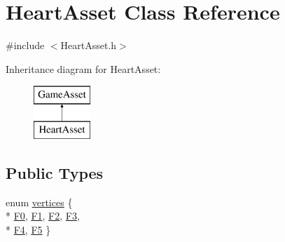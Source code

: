 \hypertarget{classHeartAsset}{\section{Heart\-Asset Class Reference}
\label{classHeartAsset}
}


{\ttfamily \#include $<$Heart\-Asset.\-h$>$}

Inheritance diagram for Heart\-Asset\-:\begin{figure}[H]
\begin{center}
\leavevmode
\includegraphics[height=2.000000cm]{classHeartAsset}
\end{center}
\end{figure}
\subsection*{Public Types}
\begin{DoxyCompactItemize}
\item 
enum \hyperlink{classHeartAsset_ab2382a6a68d870ea588f3e993a1451d0}{vertices} \{ \\*
\hyperlink{classHeartAsset_ab2382a6a68d870ea588f3e993a1451d0a3b7c6d42e96cb2f900f179d223236f11}{F0}, 
\hyperlink{classHeartAsset_ab2382a6a68d870ea588f3e993a1451d0af6d5902a14c48e5f35f74c16afafbe9a}{F1}, 
\hyperlink{classHeartAsset_ab2382a6a68d870ea588f3e993a1451d0a9da21cb8da0427c073dc2260b549e761}{F2}, 
\hyperlink{classHeartAsset_ab2382a6a68d870ea588f3e993a1451d0a0280f1f7097bf67d876440c3cf2e361c}{F3}, 
\\*
\hyperlink{classHeartAsset_ab2382a6a68d870ea588f3e993a1451d0a37d27782c67bdb394c66fde29473ddf3}{F4}, 
\hyperlink{classHeartAsset_ab2382a6a68d870ea588f3e993a1451d0ac5e53a8bb99468ed9401d0067cf96eb8}{F5}
 \}
\end{DoxyCompactItemize}
